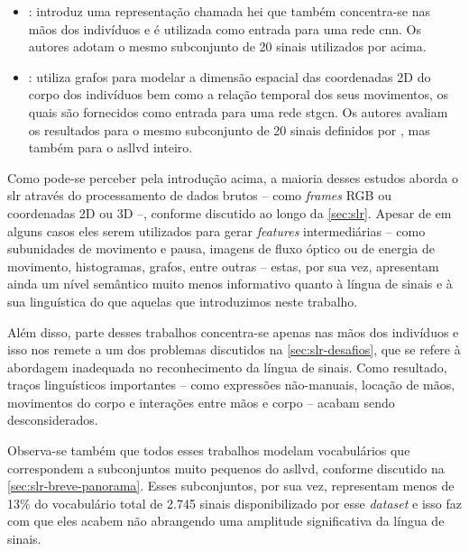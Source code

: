 \begin{itemize}
      \item \textbf{}: introduz uma representação chamada \acrfull{hei} que também concentra-se nas mãos dos indivíduos e é utilizada como entrada para uma rede \acrfull{cnn}.
            Os autores adotam o mesmo subconjunto de 20 sinais utilizados por  acima.

      \item \textbf{}: utiliza grafos para modelar a dimensão espacial das coordenadas 2D do corpo dos indivíduos bem como a relação temporal dos seus movimentos, os quais são fornecidos como entrada para uma rede \acrfull{stgcn}.
            Os autores avaliam os resultados para o mesmo subconjunto de 20 sinais definidos por , mas também para o \acrshort{asllvd} inteiro.
\end{itemize}


Como pode-se perceber pela introdução acima, a maioria desses estudos aborda o \acrshort{slr} através do processamento de dados brutos -- como \textit{frames} RGB ou coordenadas 2D ou 3D --, conforme discutido ao longo da \autoref{sec:slr}.
Apesar de em alguns casos eles serem utilizados para gerar \textit{features} intermediárias -- como subunidades de movimento e pausa, imagens de fluxo óptico ou de energia de movimento, histogramas, grafos, entre outras -- estas, por sua vez, apresentam ainda um nível semântico muito menos informativo quanto à língua de sinais e à sua linguística do que aquelas que introduzimos neste trabalho.

Além disso, parte desses trabalhos concentra-se apenas nas mãos dos indivíduos e isso nos remete a um dos problemas discutidos na \autoref{sec:slr-desafios}, que se refere à abordagem inadequada no reconhecimento da língua de sinais. Como resultado, traços linguísticos importantes -- como expressões não-manuais, locação de mãos, movimentos do corpo e interações entre mãos e corpo -- acabam sendo desconsiderados.

Observa-se também que todos esses trabalhos modelam vocabulários que correspondem a subconjuntos muito pequenos do \acrshort{asllvd}, conforme discutido na \autoref{sec:slr-breve-panorama}.
Esses subconjuntos, por sua vez, representam menos de 13\% do vocabulário total de 2.745 sinais disponibilizado por esse \textit{dataset} e isso faz com que eles acabem não abrangendo uma amplitude significativa da língua de sinais.

